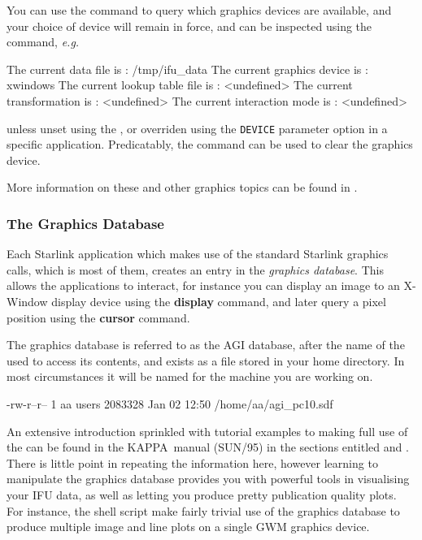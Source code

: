 \documentclass[twoside,11pt]{starlink}
\providecommand{\KAPPA}{{\footnotesize KAPPA}\normalsize}
\begin{document}
You can use the  command to query which
graphics devices are available, and your choice of device will remain
in force, and can be inspected using the
 command, \emph{e.g.}\

\begin{small}
\begin{terminalv}
The current data file is             : /tmp/ifu_data
The current graphics device is       : xwindows
The current lookup table file is     : <undefined>
The current transformation is        : <undefined>
The current interaction mode is      : <undefined>
\end{terminalv}
\end{small}

unless unset using the , or
overriden using the \texttt{DEVICE} parameter option in a specific
application.  Predicatably, the 
command can be used to clear the graphics device.

More information on these and other graphics topics can be found in
.

\subsubsection{The Graphics Database}

Each Starlink application which makes use of the standard Starlink
graphics calls, which is most of them, creates an entry in the
\emph{graphics database}.  This allows the applications to interact, for
instance you can display an image to an X-Window display device using
the \textbf{display} command, and later query a pixel position using the
\textbf{cursor} command.

The graphics database is referred to as the AGI database, after the
name of the  used to access its
contents, and exists as a file stored in your home directory.  In most
circumstances it will be named for the machine you are working on.

\begin{small}
\begin{terminalv}
-rw-r--r--  1 aa   users  2083328 Jan 02 12:50  /home/aa/agi_pc10.sdf
\end{terminalv}
\end{small}

An extensive introduction sprinkled with tutorial examples to making
full use of the  can be
found in the \KAPPA\ manual (SUN/95) in the sections entitled
 and
.
There is little point in repeating the information here, however
learning to manipulate the graphics database provides you with
powerful tools in visualising your IFU data, as well as letting you
produce pretty publication quality plots.  For instance, the  shell script make fairly trivial use of the
graphics database to produce multiple image and line plots on a
single GWM graphics device.
\end{document}
